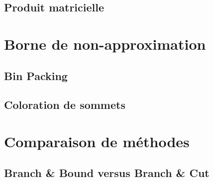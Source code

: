 \subsection{Produit matricielle}



%

\section{Borne de non-approximation}

\subsection{Bin Packing}


\subsection{Coloration de sommets}


\section{Comparaison de méthodes}

\subsection{Branch \& Bound versus Branch \& Cut}


\pagebreak
